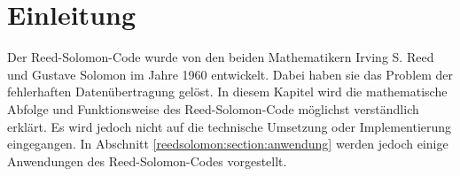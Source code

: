 %
%
%
\section{Einleitung
\label{reedsolomon:section:einleitung}}
Der Reed-Solomon-Code wurde von den beiden Mathematikern Irving S. Reed und Gustave Solomon im Jahre 1960 entwickelt.
%
%
Dabei haben sie das Problem der fehlerhaften Datenübertragung gelöst.
In diesem Kapitel wird die mathematische Abfolge und  
Funktionsweise des Reed-Solomon-Code möglichst verständlich erklärt.
Es wird jedoch nicht auf die technische Umsetzung oder Implementierung eingegangen.
In Abschnitt \ref{reedsolomon:section:anwendung} werden jedoch einige Anwendungen des Reed-Solomon-Codes vorgestellt.




